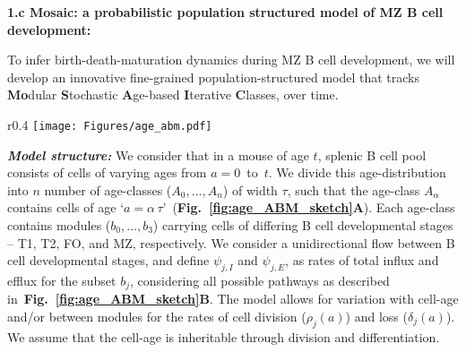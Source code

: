 \documentclass[11pt]{article}
\begin{document}
\textbf{{1.c Mosaic: a probabilistic population structured model of MZ B cell development:}}

To infer birth-death-maturation dynamics during MZ B cell development, we will develop an innovative fine-grained population-structured model that tracks \textbf{Mo}dular \textbf{S}tochastic \textbf{A}ge-based \textbf{I}terative \textbf{C}lasses, over time.

\begin{wrapfigure}{r}{0.4\textwidth}
\centering
\vspace*{-4mm}
\texttt{[image: Figures/age\_abm.pdf]}
\vspace*{-7mm}
\caption{\textbf{Schematics of the Mosaic model.} Cell-age is defined as the time since cell's exit from the BM.} %
\vspace*{-6mm}
\label{fig:age_ABM_sketch}
\end{wrapfigure}

\textbf{\textit{Model structure:}}
We consider that in a mouse of age $t$, splenic B cell pool consists of cells of varying ages from $a=0$~to~$t$.
We divide this age-distribution into $n$ number of age-classes ($A_{0} ,\ldots, A_{n}$)  of width $\tau$, such that the age-class $A_\alpha$ contains cells of age `$a=\alpha \, \tau$'~(\textbf{Fig.~\ref{fig:age_ABM_sketch}A}).
Each age-class contains modules ($b_{0} ,\ldots, b_{3}$) carrying cells of differing B cell developmental stages -- T1, T2, FO, and MZ, respectively. %
We consider a unidirectional flow between B cell developmental stages, and define $\psi_{j, I}$ and $\psi_{j, E}$, as rates of total influx and efflux for the subset $b_j$, considering all possible pathways as described in~\textbf{Fig.~\ref{fig:age_ABM_sketch}B}.
The model allows for variation with cell-age and/or between modules for the rates of cell division ($\rho_{j}(a)$) and loss ($\delta_{j}(a)$). 
We assume that the cell-age is inheritable through division and differentiation.
\end{document}
